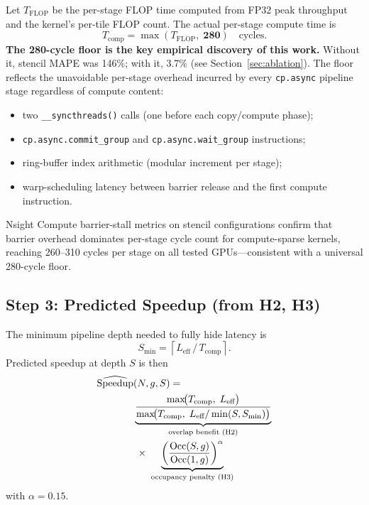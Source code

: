 \documentclass[10pt,twocolumn]{article}
\newcommand{\cpasync}{\texttt{cp.async}}
\newcommand{\Leff}{L_{\text{eff}}}
\newcommand{\Tcomp}{T_{\text{comp}}}
\newcommand{\Smin}{S_{\min}}
\begin{document}
Let $T_{\text{FLOP}}$ be the per-stage FLOP time computed from FP32
peak throughput and the kernel's per-tile FLOP count.  The actual
per-stage compute time is
\begin{equation}
  \Tcomp = \max\!\left(T_{\text{FLOP}},\; \mathbf{280}\right)
  \quad\text{cycles}.
\end{equation}
\textbf{The 280-cycle floor is the key empirical discovery of this
work.} Without it, stencil MAPE was 146\%; with it, 3.7\% (see
Section~\ref{sec:ablation}).  The floor reflects the unavoidable
per-stage overhead incurred by every \cpasync{} pipeline stage
regardless of compute content:

\begin{itemize}
\item two \texttt{\_\_syncthreads()} calls (one before each
  copy/compute phase);
\item \texttt{cp.async.commit\_group} and
  \texttt{cp.async.wait\_group} instructions;
\item ring-buffer index arithmetic (modular increment per stage);
\item warp-scheduling latency between barrier release and the first
  compute instruction.
\end{itemize}
Nsight Compute barrier-stall metrics on stencil configurations
confirm that barrier overhead dominates per-stage cycle count for
compute-sparse kernels, reaching 260--310 cycles per stage on all
tested GPUs---consistent with a universal 280-cycle floor.

\subsection{Step 3: Predicted Speedup (from H2, H3)}

The minimum pipeline depth needed to fully hide latency is
\begin{equation}
  \Smin = \left\lceil \Leff \,/\, \Tcomp \right\rceil.
\end{equation}
Predicted speedup at depth $S$ is then
\begin{align}
\widehat{\text{Speedup}}&(N, g, S) = \notag \\
  &\underbrace{\frac{\max\!\bigl(\Tcomp,\; \Leff\bigr)}
                    {\max\!\bigl(\Tcomp,\; \Leff / \min(S, \Smin)\bigr)}}_{
                    \text{overlap benefit (H2)}} \notag \\
  &\;\times\;
  \underbrace{\left(\frac{\operatorname{Occ}(S, g)}
                         {\operatorname{Occ}(1, g)}\right)^{\alpha}}_{
                         \text{occupancy penalty (H3)}}
\label{eq:speedup}
\end{align}
with $\alpha = 0.15$.
\end{document}
